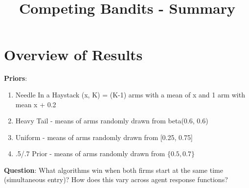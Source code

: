 \documentclass[11pt,letterpaper]{article}
\begin{document}
 

\title{Competing Bandits - Summary}
\maketitle

\section*{Overview of Results}

\textbf{Priors}:
\begin{enumerate}
\item Needle In a Haystack (x, K) = (K-1) arms with a mean of x and 1 arm with mean x + 0.2
\item Heavy Tail - means of arms randomly drawn from beta(0.6, 0.6)
\item Uniform - means of arms randomly drawn from [0.25, 0.75]
\item .5/.7 Prior - means of arms randomly drawn from $\{0.5, 0.7\}$
\end{enumerate}

\textbf{Question}: What algorithms win when both firms start at the same time (simultaneous entry)? How does this vary across agent response functions?
\end{document}
